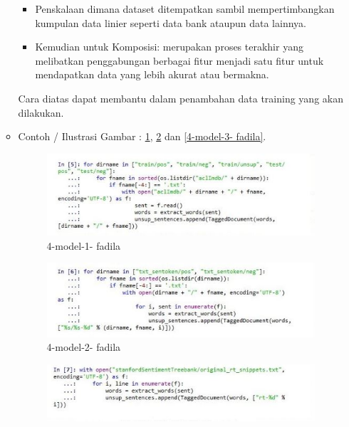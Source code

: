 \begin{enumerate}
\begin{itemize}
\begin{itemize}
\item Penskalaan dimana dataset ditempatkan sambil mempertimbangkan kumpulan data linier seperti data bank ataupun data lainnya.
\item Kemudian untuk Komposisi: merupakan proses terakhir yang melibatkan penggabungan berbagai fitur menjadi satu fitur untuk mendapatkan data yang lebih akurat atau bermakna.
\par
\end{itemize}
\par Cara diatas dapat membantu dalam penambahan data training yang akan dilakukan.
\par
\par
\item Contoh / Ilustrasi Gambar : \ref{4-model-1- fadila}, \ref{4-model-2- fadila} dan \ref{4-model-3- fadila}.
\par
\begin{figure}[!hbtp]
\centering
\includegraphics[scale=0.3]{figures/4-model-1-fadila.jpg}
\caption{4-model-1- fadila}
\label{4-model-1- fadila}
\end{figure}
\par
\par
\begin{figure}[!hbtp]
\centering
\includegraphics[scale=0.3]{figures/4-model-2-fadila.jpg}
\caption{4-model-2- fadila}
\label{4-model-2- fadila}
\end{figure}
\par
\begin{figure}[!hbtp]
\centering
\includegraphics[scale=0.3]{figures/4-model-3-fadila.jpg}

\end{figure}
\end{itemize}
\end{enumerate}
